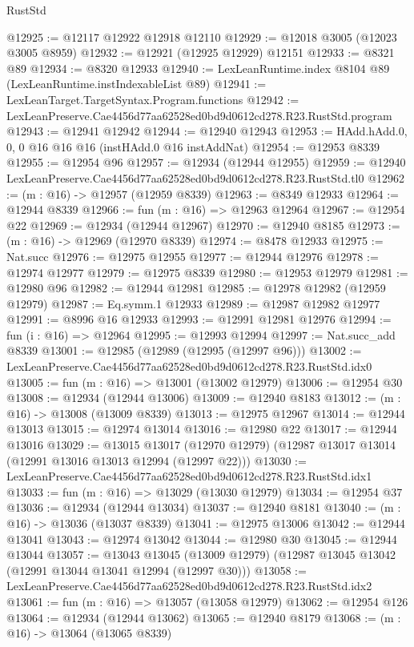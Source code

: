 \begin{lexlean}{RustStd}
\begin{coremodule}
@12925 := @12117 @12922 @12918 @12110
@12929 := @12018 @3005 (@12023 @3005 @8959)
@12932 := @12921 (@12925 @12929) @12151
@12933 := @8321 @89
@12934 := @8320 @12933
@12940 := LexLeanRuntime.index @8104 @89 (LexLeanRuntime.instIndexableList @89)
@12941 := LexLeanTarget.TargetSyntax.Program.functions
@12942 := LexLeanPreserve.Cae4456d77aa62528ed0bd9d0612cd278.R23.RustStd.program
@12943 := @12941 @12942
@12944 := @12940 @12943
@12953 := HAdd.hAdd.{0, 0, 0} @16 @16 @16 (instHAdd.{0} @16 instAddNat)
@12954 := @12953 @8339
@12955 := @12954 @96
@12957 := @12934 (@12944 @12955)
@12959 := @12940 LexLeanPreserve.Cae4456d77aa62528ed0bd9d0612cd278.R23.RustStd.tl0
@12962 := (m : @16) -> @12957 (@12959 @8339)
@12963 := @8349 @12933
@12964 := @12944 @8339
@12966 := fun (m : @16) => @12963 @12964
@12967 := @12954 @22
@12969 := @12934 (@12944 @12967)
@12970 := @12940 @8185
@12973 := (m : @16) -> @12969 (@12970 @8339)
@12974 := @8478 @12933
@12975 := Nat.succ
@12976 := @12975 @12955
@12977 := @12944 @12976
@12978 := @12974 @12977
@12979 := @12975 @8339
@12980 := @12953 @12979
@12981 := @12980 @96
@12982 := @12944 @12981
@12985 := @12978 @12982 (@12959 @12979)
@12987 := Eq.symm.{1} @12933
@12989 := @12987 @12982 @12977
@12991 := @8996 @16 @12933
@12993 := @12991 @12981 @12976
@12994 := fun (i : @16) => @12964
@12995 := @12993 @12994
@12997 := Nat.succ_add @8339
@13001 := @12985 (@12989 (@12995 (@12997 @96)))
@13002 := LexLeanPreserve.Cae4456d77aa62528ed0bd9d0612cd278.R23.RustStd.idx0
@13005 := fun (m : @16) => @13001 (@13002 @12979)
@13006 := @12954 @30
@13008 := @12934 (@12944 @13006)
@13009 := @12940 @8183
@13012 := (m : @16) -> @13008 (@13009 @8339)
@13013 := @12975 @12967
@13014 := @12944 @13013
@13015 := @12974 @13014
@13016 := @12980 @22
@13017 := @12944 @13016
@13029 := @13015
    @13017
    (@12970 @12979)
    (@12987 @13017 @13014 (@12991 @13016 @13013 @12994 (@12997 @22)))
@13030 := LexLeanPreserve.Cae4456d77aa62528ed0bd9d0612cd278.R23.RustStd.idx1
@13033 := fun (m : @16) => @13029 (@13030 @12979)
@13034 := @12954 @37
@13036 := @12934 (@12944 @13034)
@13037 := @12940 @8181
@13040 := (m : @16) -> @13036 (@13037 @8339)
@13041 := @12975 @13006
@13042 := @12944 @13041
@13043 := @12974 @13042
@13044 := @12980 @30
@13045 := @12944 @13044
@13057 := @13043
    @13045
    (@13009 @12979)
    (@12987 @13045 @13042 (@12991 @13044 @13041 @12994 (@12997 @30)))
@13058 := LexLeanPreserve.Cae4456d77aa62528ed0bd9d0612cd278.R23.RustStd.idx2
@13061 := fun (m : @16) => @13057 (@13058 @12979)
@13062 := @12954 @126
@13064 := @12934 (@12944 @13062)
@13065 := @12940 @8179
@13068 := (m : @16) -> @13064 (@13065 @8339)

\end{coremodule}
\end{lexlean}
